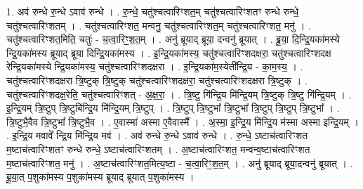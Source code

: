 \documentclass[17pt]{extarticle}
\begin{document}
1. अव॑ रुन्धे रु॒न्धे ऽवाव॑ रुन्धे । . रु॒न्धे॒ चतु॑श्चत्वारिꣳशत॒म् चतु॑श्चत्वारिꣳशतꣳ रुन्धे रुन्धे॒ चतु॑श्चत्वारिꣳशतम् । . चतु॑श्चत्वारिꣳशत॒ मन्वनु॒ चतु॑श्चत्वारिꣳशत॒म् चतु॑श्चत्वारिꣳशत॒ मनु॑ । . चतु॑श्चत्वारिꣳशत॒मिति॒ चतुः॑ - च॒त्वा॒रिꣳ॒॒श॒त॒म् । . अनु॑ ब्रूयाद् ब्रूया॒ दन्वनु॑ ब्रूयात् । . ब्रू॒या॒ दि॒न्द्रि॒यका॑मस्ये न्द्रि॒यका॑मस्य ब्रूयाद् ब्रूया दिन्द्रि॒यका॑मस्य । . इ॒न्द्रि॒यका॑मस्य॒ चतु॑श्चत्वारिꣳशदक्षरा॒ चतु॑श्चत्वारिꣳशदक्ष रेन्द्रि॒यका॑मस्ये न्द्रि॒यका॑मस्य॒ चतु॑श्चत्वारिꣳशदक्षरा । . इ॒न्द्रि॒यका॑म॒स्येती᳚न्द्रि॒य - का॒म॒स्य॒ । . चतु॑श्चत्वारिꣳशदक्षरा त्रि॒ष्टुक् त्रि॒ष्टुक् चतु॑श्चत्वारिꣳशदक्षरा॒ चतु॑श्चत्वारिꣳशदक्षरा त्रि॒ष्टुक् । . चतु॑श्चत्वारिꣳशदक्ष॒रेति॒ चतु॑श्चत्वारिꣳशत् - अ॒क्ष॒रा॒ । . त्रि॒ष्टु गि॑न्द्रि॒य मि॑न्द्रि॒यम् त्रि॒ष्टुक् त्रि॒ष्टु गि॑न्द्रि॒यम् । . इ॒न्द्रि॒यम् त्रि॒ष्टुप् त्रि॒ष्टुबि॑न्द्रि॒य मि॑न्द्रि॒यम् त्रि॒ष्टुप् । . त्रि॒ष्टुप् त्रि॒ष्टुभा᳚ त्रि॒ष्टुभा᳚ त्रि॒ष्टुप् त्रि॒ष्टुप् त्रि॒ष्टुभा᳚ । . त्रि॒ष्टुभै॒वैव त्रि॒ष्टुभा᳚ त्रि॒ष्टुभै॒व । . ए॒वास्मा॑ अस्मा ए॒वैवास्मै᳚ । . अ॒स्मा॒ इ॒न्द्रि॒य मि॑न्द्रि॒य म॑स्मा अस्मा इन्द्रि॒यम् । . इ॒न्द्रि॒य मवावे᳚ न्द्रि॒य मि॑न्द्रि॒य मव॑ । . अव॑ रुन्धे रु॒न्धे ऽवाव॑ रुन्धे । . रु॒न्धे॒ ऽष्टाच॑त्वारिꣳशत म॒ष्टाच॑त्वारिꣳशतꣳ रुन्धे रुन्धे॒ ऽष्टाच॑त्वारिꣳशतम् । . अ॒ष्टाच॑त्वारिꣳशत॒ मन्वन्व॒ष्टाच॑त्वारिꣳशत म॒ष्टाच॑त्वारिꣳशत॒ मनु॑ । . अ॒ष्टाच॑त्वारिꣳशत॒मित्य॒ष्टा - च॒त्वा॒रिꣳ॒॒श॒त॒म् । . अनु॑ ब्रूयाद् ब्रूया॒दन्वनु॑ ब्रूयात् । . ब्रू॒या॒त् प॒शुका॑मस्य प॒शुका॑मस्य ब्रूयाद् ब्रूयात् प॒शुका॑मस्य । \newline
\end{document}
